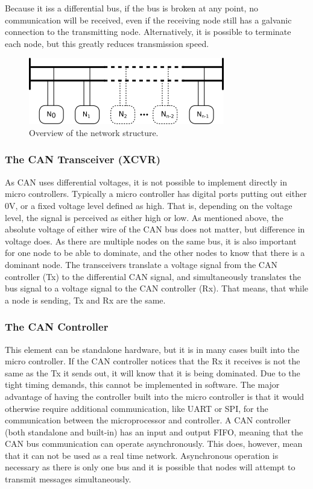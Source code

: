 Because it iss a differential bus, if the bus is broken at any point, no communication will be received, even if the receiving node still has a galvanic connection to the transmitting node.
Alternatively, it is possible to terminate each node, but this greatly reduces transmission speed.

\begin{figure}[h]
	\centering
	\includegraphics[width=.75\linewidth]{graphics/analysis_nodes}
	\caption{Overview of the network structure.}
	\label{fig:analysisnodes}
\end{figure}

\subsubsection*{The CAN Transceiver (XCVR)}
As CAN uses differential voltages, it is not possible to implement directly in micro controllers.
Typically a micro controller has digital ports putting out either $ 0 \si{\volt}$, or a fixed voltage level defined as high.
That is, depending on the voltage level, the signal is perceived as either high or low.
As mentioned above, the absolute voltage of either wire of the CAN bus does not matter, but difference in voltage does. 
As there are multiple nodes on the same bus, it is also important for one node to be able to dominate, and the other nodes to know that there is a dominant node.
The transceivers translate a voltage signal from the CAN controller (Tx) to the differential CAN signal, and simultaneously translates the bus signal to a voltage signal to the CAN controller (Rx).
That means, that while a node is sending, Tx and Rx are the same.

\subsubsection*{The CAN Controller}
This element can be standalone hardware, but it is in many cases built into the micro controller.
If the CAN controller notices that the Rx it receives is not the same as the Tx it sends out, it will know that it is being dominated.
Due to the tight timing demands, this cannot be implemented in software.
The major advantage of having the controller built into the micro controller is that it would otherwise require additional communication, like UART or SPI, for the communication between the microprocessor and controller.
A CAN controller (both standalone and built-in) has an input and output FIFO, meaning that the CAN bus communication can operate asynchronously.
This does, however, mean that it can not be used as a real time network.
Asynchronous operation is necessary as there is only one bus and it is possible that nodes will attempt to transmit messages simultaneously.

